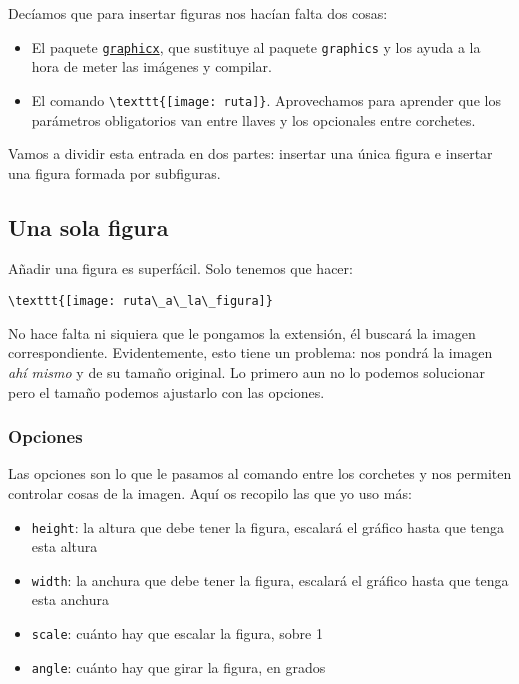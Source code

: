 Decíamos que para insertar figuras nos hacían falta dos cosas:

\begin{itemize}
\item
  El paquete
  \href{https://ctan.org/pkg/graphicx}{\lstinline!graphicx!}, que sustituye al paquete 
  \lstinline!graphics! y los ayuda a la hora de meter las imágenes y compilar.
\item
  El comando \lstinline!\texttt{[image: ruta]}!. Aprovechamos
  para aprender que los parámetros obligatorios van entre llaves y los
  opcionales entre corchetes.
\end{itemize}

Vamos a dividir esta entrada en dos partes: insertar una única figura e
insertar una figura formada por subfiguras.

\subsection{Una sola figura}\label{sec:unaFigura}

Añadir una figura es superfácil. Solo tenemos que hacer:

\begin{lstlisting}[language={[latex]tex}]
\texttt{[image: ruta\_a\_la\_figura]} 
\end{lstlisting}

No hace falta ni siquiera que le pongamos la extensión, él buscará la
imagen correspondiente. Evidentemente, esto tiene un problema: nos
pondrá la imagen \emph{ahí mismo} y de su tamaño original. Lo primero
aun no lo podemos solucionar pero el tamaño podemos ajustarlo con las
opciones.

\subsubsection{Opciones}\label{opciones}

Las opciones son lo que le pasamos al comando entre los corchetes y nos
permiten controlar cosas de la imagen. Aquí os recopilo las que yo uso
más:

\begin{itemize}
\item
  \lstinline!height!: la altura que debe tener la figura, escalará el
  gráfico hasta que tenga esta altura
\item
  \lstinline!width!: la anchura que debe tener la figura, escalará el
  gráfico hasta que tenga esta anchura
\item
  \lstinline!scale!: cuánto hay que escalar la figura, sobre 1
\item
  \lstinline!angle!: cuánto hay que girar la figura, en grados
\end{itemize}

